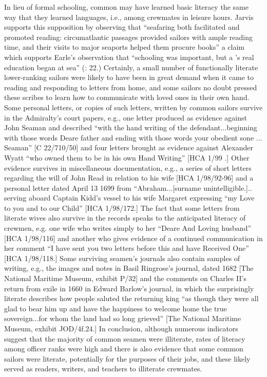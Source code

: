   In lieu of formal schooling, common  may have learned basic literacy the same way that they learned languages, i.e., among crewmates in leisure hours. Jarvis supports this supposition by observing that “seafaring both facilitated and promoted reading: circumatlantic passages provided sailors with ample reading time, and their visits to major seaports helped them procure books” \citep[307,]{Jarvis2010} a claim which supports Earle’s observation that “schooling was important, but a ’s real education began at sea” (\citeyear*{Earle1998}: 22.) Certainly, a small number of functionally literate lower-ranking sailors were likely to have been in great demand when it came to reading and responding to letters from home, and some sailors no doubt pressed these scribes to learn how to communicate with loved ones in their own hand. Some personal letters, or copies of such letters, written by common sailors survive in the Admiralty’s court papers, e.g., one letter produced as evidence against John Seaman and described “with the hand writing of the defendant...beginning with those words Deare father and ending with those words your obedient sone ... Seaman” [C 22/710/50] and four letters brought as evidence against Alexander Wyatt “who owned them to be in his own Hand Writing” [HCA 1/99  \citealt{Islands1722}.] Other evidence survives in miscellaneous documentation, e.g., a series of short letters regarding the will of John Read in relation to his wife [HCA 1/98/92-96] and a personal letter dated April 13 1699 from “Abraham...[surname unintelligible.].. serving aboard Captain Kidd’s vessel to his wife Margaret expressing “my Love to you and to our Child” [HCA 1/98/172.] The fact that some letters from literate wives also survive in the records speaks to the anticipated literacy of crewmen, e.g. one wife who writes simply to her “Deare And Loving husband” [HCA 1/98/116] and another who gives evidence of a continued communication in her comment “I have sent you two letters before this and have Received One” [HCA 1/98/118.] Some surviving seamen’s journals also contain samples of writing, e.g., the images and notes in Basil Ringrose’s journal, dated 1682 [The National Maritime Museum, exhibit P/32] and the comments on Charles II’s return from exile in 1660 in Edward Barlow’s journal, in which the surprisingly literate  describes how people saluted the returning king “as though they were all glad to bear him up and have the happiness to welcome home the true sovereign...for whom the land had so long grieved” [The National Maritime Museum, exhibit JOD/4f.24.] In conclusion, although numerous indicators suggest that the majority of common seamen were illiterate, rates of literacy among officer ranks were high and there is also evidence that some common sailors were literate, potentially for the purposes of their jobs, and these likely served as readers, writers, and teachers to illiterate crewmates. 

